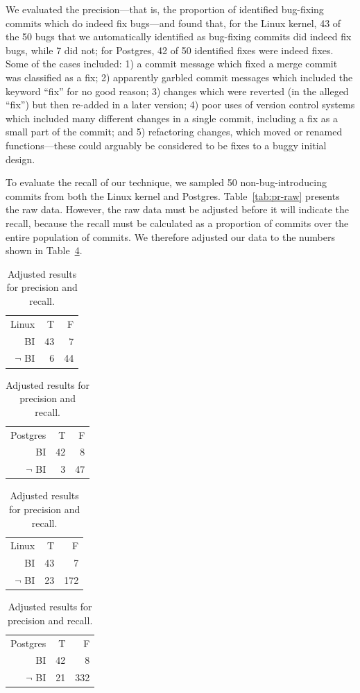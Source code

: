 We evaluated the precision---that is, the proportion of identified
bug-fixing commits which do indeed fix bugs---and found that, for
the Linux kernel, 43 of the 50 bugs that we automatically identified as
bug-fixing commits did indeed fix bugs, while 7 did not; for Postgres,
42 of 50 identified fixes were indeed fixes.  Some of the
cases included: 1) a commit message which fixed a merge commit was
classified as a fix; 2) apparently garbled commit messages which
included the keyword ``fix'' for no good reason; 3) changes which were
reverted (in the alleged ``fix'') but then re-added in a later
version; 4) poor uses of version control systems which included many
different changes in a single commit, including a fix as a small part 
of the commit; and 5) refactoring changes, which moved or renamed
functions---these could arguably be considered to be fixes to a buggy
initial design.

To evaluate the recall of our technique, we sampled 50
non-bug-introducing commits from both the Linux kernel and
Postgres. Table~\ref{tab:pr-raw} presents the raw data. However, the
raw data must be adjusted before it will indicate the recall, because
the recall must be calculated as a proportion of commits over the
entire population of commits. We therefore adjusted our data to the
numbers shown in Table~\ref{tab:pr-adj}.


\begin{table}
\begin{center}
\begin{tabular}{rrr}
Linux & T & F \\
BI & 43 & 7 \\
$\neg$ BI & 6 & 44 \\
\end{tabular} \begin{tabular}{rrr} Postgres & T & F \\
BI & 42 & 8 \\
$\neg$ BI & 3 & 47
\end{tabular}
\end{center}
\caption{\label{tab:pr-raw}Raw results for precision and recall.}
\begin{center}
\begin{tabular}{rrr}
Linux & T & F \\
BI & 43 & 7 \\
$\neg$ BI & 23 & 172 \\
\end{tabular} \begin{tabular}{rrr} Postgres & T & F \\
BI & 42 & 8 \\
$\neg$ BI & 21 & 332
\end{tabular}
\end{center}
\caption{\label{tab:pr-adj}Adjusted results for precision and recall.}
\end{table}


